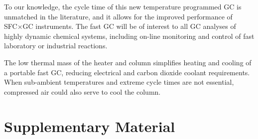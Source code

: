 \documentclass[aip,rsi,preprint,graphicx]{revtex4-1} %
\begin{document}
To our knowledge, the cycle time of this new temperature programmed GC is
unmatched in the literature, and it allows for the improved performance of
SFC×GC instruments. The fast GC will be of interest to all GC analyses of
highly dynamic chemical systems, including on-line monitoring and control of
fast laboratory or industrial reactions.

The low thermal mass of the heater and column simplifies heating and cooling of
a portable fast GC, reducing electrical and carbon dioxide coolant requirements.
When sub-ambient temperatures and extreme cycle times are not essential,
compressed air could also serve to cool the column.


%
%

%

\section*{Supplementary Material}
\end{document}
